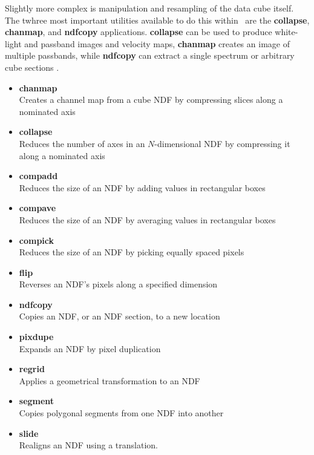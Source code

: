 \documentclass[twoside,11pt]{article}
\newcommand{\htmlref}[2]{#1}
\newcommand{\xref}[3]{#1}
\begin{document}
{Slightly more complex is manipulation and resampling of the data cube
itself.  The twhree most important utilities available to do this within
\KAPPA\ are the \xref{{\bf collapse}}{sun95}{COLLAPSE}, 
\xref{{\bf chanmap}}{sun95}{CHANMAP}, and
\xref{{\bf ndfcopy}}{sun95}{NDFCOPY} applications.  {\bf collapse} can
be used to produce \htmlref{white-light and passband}{sc16_vis} images and velocity maps, {\bf chanmap} creates an
image of multiple passbands, while {\bf ndfcopy} can extract a single spectrum or 
\htmlref{arbitrary cube sections}{sc16_vis} .

\begin{itemize}
\item{\xref{{\bf chanmap}}{sun95}{CHANMAP}}\\
Creates a channel map from a cube NDF by compressing slices along a nominated axis
\item{\xref{{\bf collapse}}{sun95}{COLLAPSE}}\\
Reduces the number of axes in an $N$-dimensional NDF by compressing it along a nominated axis 
\item{\xref{{\bf compadd}}{sun95}{COMPADD}}\\
Reduces the size of an NDF by adding values in rectangular boxes 
\item{\xref{{\bf compave}}{sun95}{COMPAVE}}\\
Reduces the size of an NDF by averaging values in rectangular boxes 
\item{\xref{{\bf compick}}{sun95}{COMPICK}}\\
Reduces the size of an NDF by picking equally spaced pixels 
\item{\xref{{\bf flip}}{sun95}{FLIP}}\\
Reverses an NDF's pixels along a specified dimension 
\item{\xref{{\bf ndfcopy}}{sun95}{NDFCOPY}}\\
Copies an NDF, or an NDF section, to a new location 
\item{\xref{{\bf pixdupe}}{sun95}{PIXDUPE}}\\
Expands an NDF by pixel duplication 
\item{\xref{{\bf regrid}}{sun95}{REGRID}}\\
Applies a geometrical transformation to an NDF
\item{\xref{{\bf segment}}{sun95}{SEGMENT}}\\
Copies polygonal segments from one NDF into another 
\item{\xref{{\bf slide}}{sun95}{SLIDE}}\\
Realigns an NDF using a translation.
\end{itemize}

}
\end{document}

